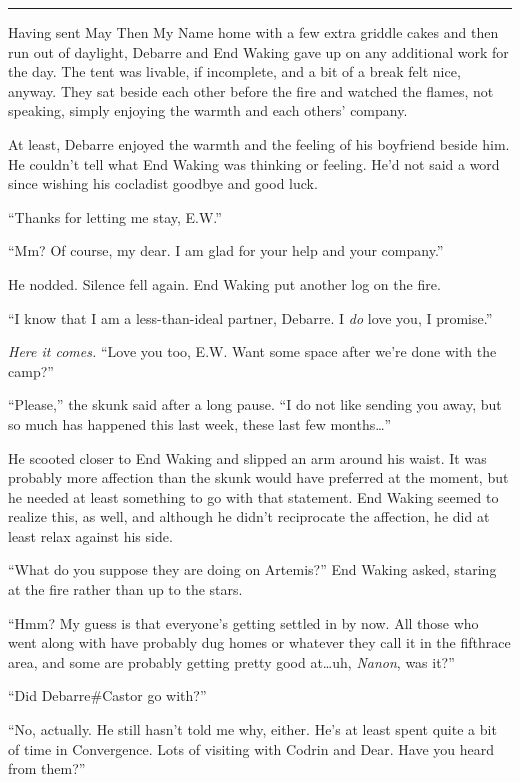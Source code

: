 \begin{center}\rule{0.5\linewidth}{0.5pt}\end{center}

Having sent May Then My Name home with a few extra griddle cakes and then run out of daylight, Debarre and End Waking gave up on any additional work for the day. The tent was livable, if incomplete, and a bit of a break felt nice, anyway. They sat beside each other before the fire and watched the flames, not speaking, simply enjoying the warmth and each others' company.

At least, Debarre enjoyed the warmth and the feeling of his boyfriend beside him. He couldn't tell what End Waking was thinking or feeling. He'd not said a word since wishing his cocladist goodbye and good luck.

``Thanks for letting me stay, E.W.''

``Mm? Of course, my dear. I am glad for your help and your company.''

He nodded. Silence fell again. End Waking put another log on the fire.

``I know that I am a less-than-ideal partner, Debarre. I \emph{do} love you, I promise.''

\emph{Here it comes.} ``Love you too, E.W. Want some space after we're done with the camp?''

``Please,'' the skunk said after a long pause. ``I do not like sending you away, but so much has happened this last week, these last few months\ldots{}''

He scooted closer to End Waking and slipped an arm around his waist. It was probably more affection than the skunk would have preferred at the moment, but he needed at least something to go with that statement. End Waking seemed to realize this, as well, and although he didn't reciprocate the affection, he did at least relax against his side.

``What do you suppose they are doing on Artemis?'' End Waking asked, staring at the fire rather than up to the stars.

``Hmm? My guess is that everyone's getting settled in by now. All those who went along with have probably dug homes or whatever they call it in the fifthrace area, and some are probably getting pretty good at\ldots uh, \emph{Nanon}, was it?''

``Did Debarre\#Castor go with?''

``No, actually. He still hasn't told me why, either. He's at least spent quite a bit of time in Convergence. Lots of visiting with Codrin and Dear. Have you heard from them?''

